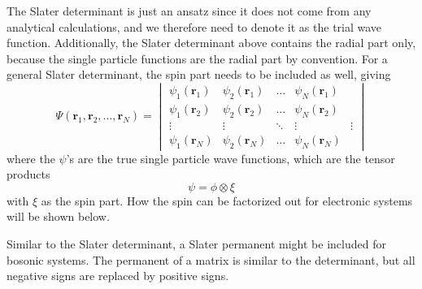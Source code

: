 The Slater determinant is just an ansatz since it does not come from any analytical calculations, and we therefore need to denote it as the trial wave function. Additionally, the Slater determinant above contains the radial part only, because the single particle functions are the radial part by convention. For a general Slater determinant, the spin part needs to be included as well, giving 
\begin{equation}
\Psi(\boldsymbol{r}_1,\boldsymbol{r}_2,\hdots,\boldsymbol{r}_N)=
\begin{vmatrix}
\psi_1(\boldsymbol{r}_1) & \psi_2(\boldsymbol{r}_1) & \hdots & \psi_N(\boldsymbol{r}_1)\\
\psi_1(\boldsymbol{r}_2) & \psi_2(\boldsymbol{r}_2) & \hdots & \psi_N(\boldsymbol{r}_2)\\
\vdots & \vdots & \ddots & \vdots & \vdots\\
\psi_1(\boldsymbol{r}_N) & \psi_2(\boldsymbol{r}_N) & \hdots & \psi_N(\boldsymbol{r}_N)
\end{vmatrix}
\end{equation}
where the $\psi$'s are the true single particle wave functions, which are the tensor products 
\begin{equation}
\psi=\phi\otimes\xi
\end{equation}
with $\xi$ as the spin part. How the spin can be factorized out for electronic systems will be shown below. 

Similar to the Slater determinant, a Slater permanent might be included for bosonic systems. The permanent of a matrix is similar to the determinant, but all negative signs are replaced by positive signs. 

